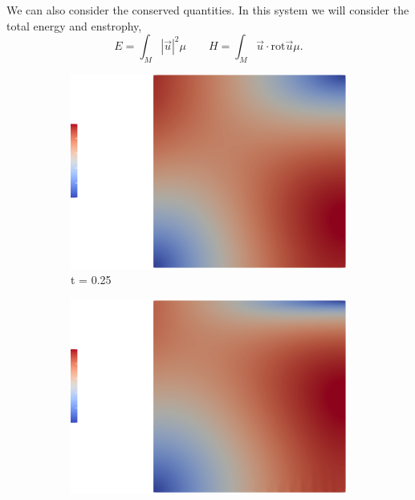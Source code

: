 \noindent
We can also consider the conserved quantities. In this system we will consider the total energy and enstrophy,
$$ E = \int_M |\vec u|^2\mu \qquad H = \int_M \vec u \cdot \mathrm{rot} \vec u\mu . $$

\begin{figure}
    \centering
    \begin{subfigure}[b]{0.475\textwidth}
        \centering
        \includegraphics[trim={5cm 0 5cm 0}, clip,width=\textwidth]{./img/25.eps}
        \caption[Network2]%
        {{\small t = 0.25}}
        \label{fig:0.25}
    \end{subfigure}
    \hfill
    \begin{subfigure}[b]{0.475\textwidth}
        \centering
        \includegraphics[trim={5cm 0 5cm 0}, clip,width=\textwidth]{./img/50.eps}

\end{subfigure}
\end{figure}
